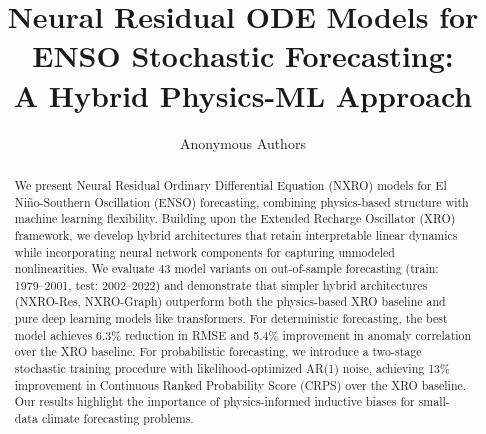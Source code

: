 \documentclass[11pt]{article}
\title{Neural Residual ODE Models for ENSO Stochastic Forecasting: \\
\large A Hybrid Physics-ML Approach}
\author{Anonymous Authors}
\date{}
\newcommand{\1}{\mathbf{1}}
\begin{document}
\maketitle

\begin{abstract}
We present Neural Residual Ordinary Differential Equation (NXRO) models for El Ni\~no-Southern Oscillation (ENSO) forecasting, combining physics-based structure with machine learning flexibility. Building upon the Extended Recharge Oscillator (XRO) framework, we develop hybrid architectures that retain interpretable linear dynamics while incorporating neural network components for capturing unmodeled nonlinearities. We evaluate 43 model variants on out-of-sample forecasting (train: 1979--2001, test: 2002--2022) and demonstrate that simpler hybrid architectures (NXRO-Res, NXRO-Graph) outperform both the physics-based XRO baseline and pure deep learning models like transformers. For deterministic forecasting, the best model achieves 6.3\% reduction in RMSE and 5.4\% improvement in anomaly correlation over the XRO baseline. For probabilistic forecasting, we introduce a two-stage stochastic training procedure with likelihood-optimized AR(1) noise, achieving 13\% improvement in Continuous Ranked Probability Score (CRPS) over the XRO baseline. Our results highlight the importance of physics-informed inductive biases for small-data climate forecasting problems.
\end{abstract}

\tableofcontents
\newpage

















\end{document}
